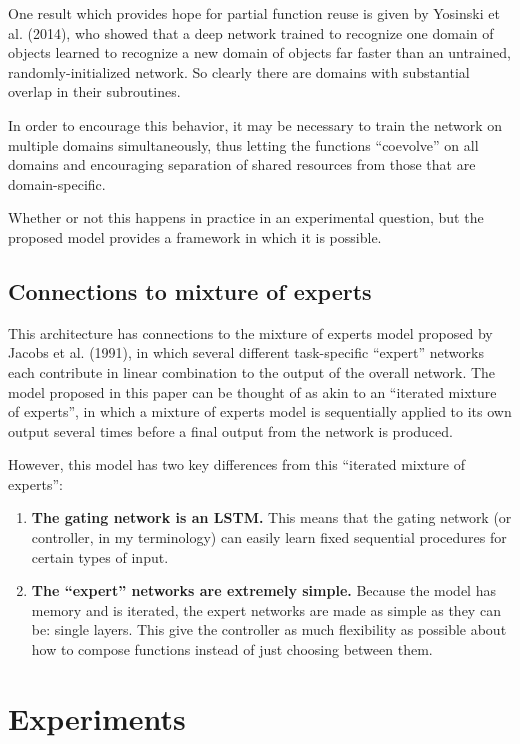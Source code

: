 \documentclass[]{article}
\providecommand{\tightlist}{%
  \setlength{\itemsep}{0pt}\setlength{\parskip}{0pt}}
\begin{document}
One result which provides hope for partial function reuse is given by
Yosinski et al. (2014), who showed that a deep network trained to
recognize one domain of objects learned to recognize a new domain of
objects far faster than an untrained, randomly-initialized network. So
clearly there are domains with substantial overlap in their subroutines.

In order to encourage this behavior, it may be necessary to train the
network on multiple domains simultaneously, thus letting the functions
``coevolve'' on all domains and encouraging separation of shared
resources from those that are domain-specific.

Whether or not this happens in practice in an experimental question, but
the proposed model provides a framework in which it is possible.

\subsection{Connections to mixture of
experts}\label{connections-to-mixture-of-experts}

This architecture has connections to the mixture of experts model
proposed by Jacobs et al. (1991), in which several different
task-specific ``expert'' networks each contribute in linear combination
to the output of the overall network. The model proposed in this paper
can be thought of as akin to an ``iterated mixture of experts'', in
which a mixture of experts model is sequentially applied to its own
output several times before a final output from the network is produced.

However, this model has two key differences from this ``iterated mixture
of experts'':

\begin{enumerate}
\def\labelenumi{\arabic{enumi}.}
\tightlist
\item
  \textbf{The gating network is an LSTM.} This means that the gating
  network (or controller, in my terminology) can easily learn fixed
  sequential procedures for certain types of input.
\item
  \textbf{The ``expert'' networks are extremely simple.} Because the
  model has memory and is iterated, the expert networks are made as
  simple as they can be: single layers. This give the controller as much
  flexibility as possible about how to compose functions instead of just
  choosing between them.
\end{enumerate}

\section{Experiments}\label{experiments}
\end{document}
